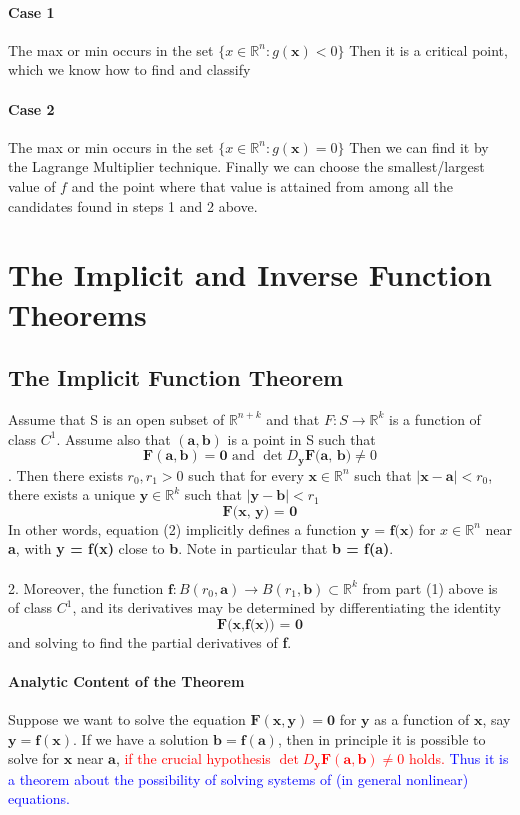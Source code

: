\documentclass[11pt]{article}
\newcommand{\tb}[1]{\textbf{#1}}
\newcommand{\real}[0]{\mathbb{R}}
\newcommand{\vx}[0]{\tb{x}}
\newcommand{\vy}[0]{\tb{y}}
\newcommand{\vo}[0]{\tb{0}}
\newcommand{\va}[0]{\tb{a}}
\newcommand{\vb}[0]{\tb{b}}
\newcommand{\vf}[0]{\tb{F}}
\newcommand{\ff}[0]{\tb{f}}
\begin{document}
\paragraph{Case 1} The max or min occurs in the set $\{x\in \real^n: g(\tb{x}) < 0\}$ \newline
Then it is a critical point, which we know how to find and classify
\paragraph{Case 2} The max or min occurs in the set $\{x\in \real^n: g(\tb{x}) = 0\}$ \newline
Then we can find it by the Lagrange Multiplier technique. \newline
Finally we can choose the smallest/largest value of $f$ and the point where that value is attained from among all the candidates found in steps 1 and 2 above.
\section{The Implicit and Inverse Function Theorems}
\subsection{The Implicit Function Theorem}
Assume that S is an open subset of $\real^{n+k}$ and that $F: S \rightarrow \real^k$ is a function of class $C^1$. Assume also that $(\tb{a}, \tb{b})$ is a point in S such that $$\tb{F}(\va, \vb)= \vo \mbox{ and } \det D_{\tb{y}}\tb{F(a, b)} \neq 0$$ . Then there exists $r_0, r_1 > 0$ such that for every $\tb{x} \in \real^n$ such that $|\tb{x} - \tb{a}| < r_0$, there exists a unique $\tb{y} \in \real^k$ such that $|\tb{y} - \tb{b}| < r_1$
\begin{equation}
	\tb{F(x, y) = 0}
\end{equation}
    In other words, equation (2) implicitly defines a function $\tb{y = f(x)}$ for $x \in \real^n$ near \tb{a}, with \tb{y = f(x)} close to \tb{b}. Note in particular that \tb{b = f(a)}. \\\\
2. Moreover, the function $\tb{f}: B(r_0,\tb{a}) \rightarrow B(r_1, \tb{b}) \subset \real^k$ from part (1) above is of class $C^1$, and its derivatives may be determined by differentiating the identity $$\tb{F(x,f(x)) = 0}$$ and solving to find the partial derivatives of \tb{f}.
\paragraph{Analytic Content of the Theorem}
Suppose we want to solve the equation $\vf(\vx, \vy) = \vo$ for $\vy$ as a function of $\vx$, say $\vy = \ff(\vx)$. If we have a solution $\vb = \ff(\va)$, then in principle it is possible to solve for $\vx$ near $\va$, \textcolor{red}{if the crucial hypothesis $\det D_\vy \vf(\va,\vb) \neq 0$ holds.} \textcolor{blue}{Thus it is a theorem about the possibility of solving systems of (in general nonlinear) equations.}
\end{document}
